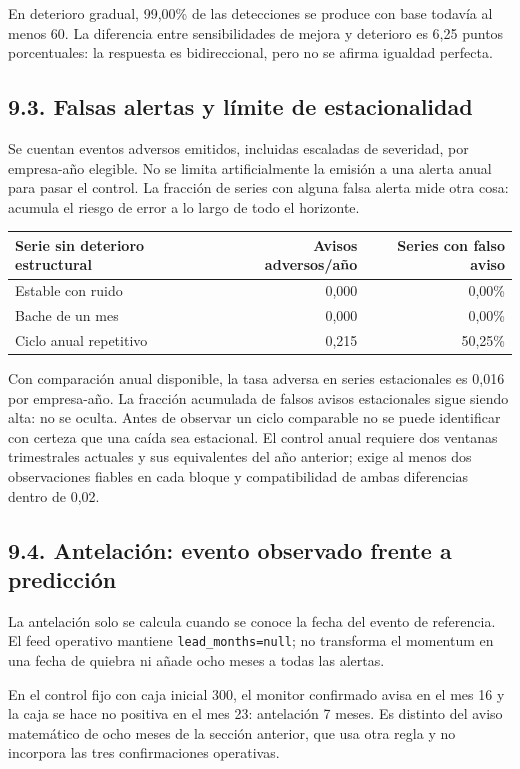 En deterioro gradual, 99,00\% de las detecciones se produce con base todavía al menos 60. La diferencia entre sensibilidades de mejora y deterioro es 6,25 puntos porcentuales: la respuesta es bidireccional, pero no se afirma igualdad perfecta.

\subsection*{9.3. Falsas alertas y límite de estacionalidad}
Se cuentan eventos adversos emitidos, incluidas escaladas de severidad, por empresa-año elegible. No se limita artificialmente la emisión a una alerta anual para pasar el control. La fracción de series con alguna falsa alerta mide otra cosa: acumula el riesgo de error a lo largo de todo el horizonte.

\begin{center}
\small
\begin{tabular}{lrr}
\hline
Serie sin deterioro estructural & Avisos adversos/año & Series con falso aviso \\
\hline
Estable con ruido & 0,000 & 0,00\% \\
Bache de un mes & 0,000 & 0,00\% \\
Ciclo anual repetitivo & 0,215 & 50,25\% \\
\hline
\end{tabular}
\end{center}

Con comparación anual disponible, la tasa adversa en series estacionales es 0,016 por empresa-año. La fracción acumulada de falsos avisos estacionales sigue siendo alta: no se oculta. Antes de observar un ciclo comparable no se puede identificar con certeza que una caída sea estacional. El control anual requiere dos ventanas trimestrales actuales y sus equivalentes del año anterior; exige al menos dos observaciones fiables en cada bloque y compatibilidad de ambas diferencias dentro de 0,02.

\subsection*{9.4. Antelación: evento observado frente a predicción}
La antelación solo se calcula cuando se conoce la fecha del evento de referencia. El feed operativo mantiene \texttt{lead\_months=null}; no transforma el momentum en una fecha de quiebra ni añade ocho meses a todas las alertas.

En el control fijo con caja inicial 300, el monitor confirmado avisa en el mes 16 y la caja se hace no positiva en el mes 23: antelación 7 meses. Es distinto del aviso matemático de ocho meses de la sección anterior, que usa otra regla y no incorpora las tres confirmaciones operativas.

